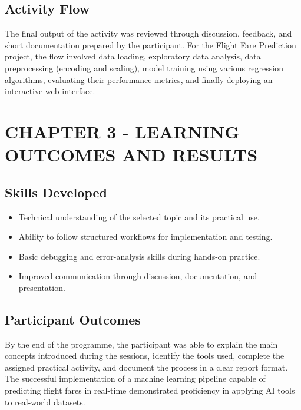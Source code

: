 \documentclass[12pt, a4paper]{article}
\begin{document}
\subsection{Activity Flow}

\vspace{0.5em}
\noindent
\colorbox{tableblue}{%
}
\vspace{0.5em}

The final output of the activity was reviewed through discussion, feedback, and short documentation prepared by the participant. For the Flight Fare Prediction project, the flow involved data loading, exploratory data analysis, data preprocessing (encoding and scaling), model training using various regression algorithms, evaluating their performance metrics, and finally deploying an interactive web interface.

\newpage

\section{CHAPTER 3 - LEARNING OUTCOMES AND RESULTS}\label{chap3}

\subsection{Skills Developed}
\begin{itemize}
    \item Technical understanding of the selected topic and its practical use.
    \item Ability to follow structured workflows for implementation and testing.
    \item Basic debugging and error-analysis skills during hands-on practice.
    \item Improved communication through discussion, documentation, and presentation.
\end{itemize}

\subsection{Participant Outcomes}
By the end of the programme, the participant was able to explain the main concepts introduced during the sessions, identify the tools used, complete the assigned practical activity, and document the process in a clear report format. The successful implementation of a machine learning pipeline capable of predicting flight fares in real-time demonstrated proficiency in applying AI tools to real-world datasets.
\end{document}
